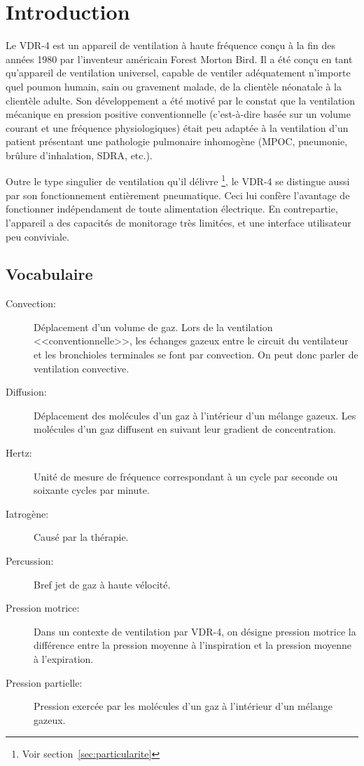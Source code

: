 \chapter{Introduction}

Le VDR-4 est un appareil de ventilation à haute fréquence conçu à la fin des
années 1980 par l'inventeur américain Forest Morton Bird.  Il a été conçu en
tant qu'appareil de ventilation universel, capable de ventiler adéquatement
n'importe quel poumon humain, sain ou gravement malade, de la clientèle
néonatale à la clientèle adulte.  Son développement a été motivé par le constat
que la ventilation mécanique en pression positive conventionnelle (c'est-à-dire
basée sur un volume courant et une fréquence physiologiques) était peu adaptée
à la ventilation d'un patient présentant une pathologie pulmonaire inhomogène
(MPOC, pneumonie, brûlure d'inhalation, SDRA, etc.).

Outre le type singulier de ventilation qu'il délivre \footnote{Voir
section~\ref{sec:particularite}}, le VDR-4 se distingue aussi par son
fonctionnement entièrement pneumatique. Ceci lui confère l'avantage de
fonctionner indépendament de toute alimentation électrique. En contrepartie,
l'appareil a des capacités de monitorage très limitées, et une interface
utilisateur peu conviviale.

\section{Vocabulaire}

\begin{description}
	\item[Convection:] Déplacement d'un volume de gaz. Lors de la ventilation
	<<conventionnelle>>, les échanges gazeux entre le circuit du ventilateur et
	les bronchioles terminales se font par convection\cite{West2017}. On peut donc parler de
		ventilation convective.  
	\item [Diffusion:] Déplacement des molécules d’un gaz à l’intérieur d’un mélange gazeux. Les molécules d’un gaz diffusent en suivant leur gradient de concentration.
	\item [Hertz:] Unité de mesure de fréquence correspondant à un cycle par seconde ou soixante cycles par minute.
	\item [Iatrogène:] Causé par la thérapie.
	\item [Percussion:] Bref jet de gaz à haute vélocité.
	\item [Pression motrice:] Dans un contexte de ventilation par VDR-4, on désigne pression motrice la différence entre la pression moyenne à l'inspiration et la pression moyenne à l'expiration.
	\item [Pression partielle:] Pression exercée par les molécules d'un gaz à l'intérieur d'un mélange gazeux.
\end{description}


